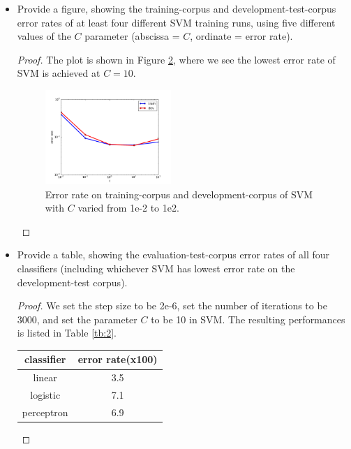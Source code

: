 \documentclass[11pt]{article}
\newcommand{\1}{\mathbf{1}}
\begin{document}
\begin{itemize}
\begin{proof}
\begin{figure}[htbp]
\begin{center}
{      }
    \end{center}
    \caption{Convergence rate of four classifiers with training step size {\rm 2e-6}.\label{fig:1}}
    \end{figure}
  \end{proof}
  \item Provide a figure, showing the training-corpus and development-test-corpus error rates of at least four different SVM training runs, using five different values of the $C$ parameter (abscissa = $C$, ordinate = error rate).
  \begin{proof}
    The plot is shown in Figure \ref{fig:2}, where we see the lowest error rate of SVM is achieved at $C=10$.
    \begin{figure}
      \begin{center}
        \includegraphics[width=0.45\textwidth]{../figures/part2.pdf}
        \caption{Error rate on training-corpus and development-corpus of SVM with $C$ varied from 1e-2 to 1e2.\label{fig:2}}
      \end{center}
    \end{figure}
  \end{proof}
  \item Provide a table, showing the evaluation-test-corpus error rates of all four classifiers (including whichever SVM has lowest error rate on the development-test corpus).
  \begin{proof}
    We set the step size to be 2e-6, set the number of iterations to be 3000, and set the parameter $C$ to be 10 in SVM. The resulting performances is listed in Table \ref{tb:2}.
    \begin{table}[htbp]
    \begin{center}
      \begin{tabular}{c|c}
      \hline
      {\bf classifier} & {\bf error rate(x100)} \\
      \hline
      linear & 3.5\\
      logistic & 7.1\\
      perceptron & 6.9\\

\end{tabular}
\end{center}
\end{table}
\end{proof}
\end{itemize}
\end{document}
